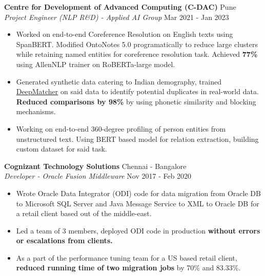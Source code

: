 \documentclass[a4paper]{article}
\begin{document}
\vspace{1mm}
\textbf{Centre for Development of Advanced Computing (C-DAC)} \hfill Pune\\
\textit{Project Engineer (NLP R\&D) - Applied AI Group} \hfill Mar 2021 - Jan 2023\\
\vspace{-1mm}
\begin{itemize} \itemsep 1pt
    \item Worked on end-to-end Coreference Resolution on English texts using SpanBERT. Modified OntoNotes 5.0 programatically to reduce large clusters while retaining named entities for coreference resolution task. Achieved \textbf{77\%} using AllenNLP trainer on RoBERTa-large model.
    \item Generated synthetic data catering to Indian demography, trained \href{https://github.com/anhaidgroup/deepmatcher}{DeepMatcher} on said data to identify potential duplicates in real-world data. \textbf{Reduced comparisons by 98\%} by using phonetic similarity and blocking mechanisms.
    \item Working on end-to-end 360-degree profiling of person entities from unstructured text. Using BERT based model for relation extraction, building custom dataset for said task.
\end{itemize}

\vspace*{2mm}

\textbf{Cognizant Technology Solutions} \hfill Chennai - Bangalore\\
\textit{Developer - Oracle Fusion Middleware} \hfill Nov 2017 - Feb 2020\\
\vspace{-1mm}
\begin{itemize} \itemsep 1pt
    \item Wrote Oracle Data Integrator (ODI) code for data migration from Oracle DB to Microsoft SQL Server and Java Message Service to XML to Oracle DB for a retail client based out of the middle-east.
    \item Led a team of 3 members, deployed ODI code in production \textbf{without errors or escalations from clients.}
    \item As a part of the performance tuning team for a US based retail client, \textbf{reduced running time of two migration jobs} by 70\% and 83.33\%.
\end{itemize}
\end{document}
